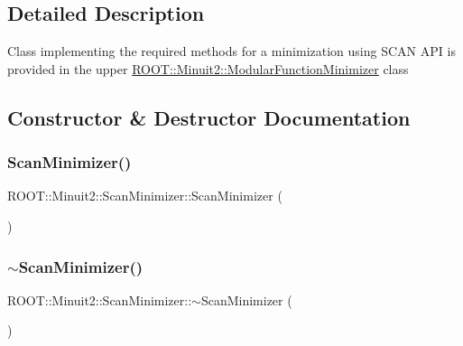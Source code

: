 \subsection{Detailed Description}
Class implementing the required methods for a minimization using S\+C\+AN A\+PI is provided in the upper \mbox{\hyperlink{classROOT_1_1Minuit2_1_1ModularFunctionMinimizer}{R\+O\+O\+T\+::\+Minuit2\+::\+Modular\+Function\+Minimizer}} class 

\subsection{Constructor \& Destructor Documentation}
\mbox{\label{classROOT_1_1Minuit2_1_1ScanMinimizer_af77ed505a71c7a2ce4581adc38e6e025}} 
\subsubsection{\texorpdfstring{ScanMinimizer()}{ScanMinimizer()}\hspace{0.1cm}{\footnotesize\ttfamily [1/3]}}
{\footnotesize\ttfamily R\+O\+O\+T\+::\+Minuit2\+::\+Scan\+Minimizer\+::\+Scan\+Minimizer (\begin{DoxyParamCaption}{ }\end{DoxyParamCaption})\hspace{0.3cm}{\ttfamily [inline]}}

\mbox{\label{classROOT_1_1Minuit2_1_1ScanMinimizer_a4c905e6b138573bf48d92cbcace158a7}} 
\subsubsection{\texorpdfstring{$\sim$ScanMinimizer()}{~ScanMinimizer()}\hspace{0.1cm}{\footnotesize\ttfamily [1/3]}}
{\footnotesize\ttfamily R\+O\+O\+T\+::\+Minuit2\+::\+Scan\+Minimizer\+::$\sim$\+Scan\+Minimizer (\begin{DoxyParamCaption}{ }\end{DoxyParamCaption})\hspace{0.3cm}{\ttfamily [inline]}}

